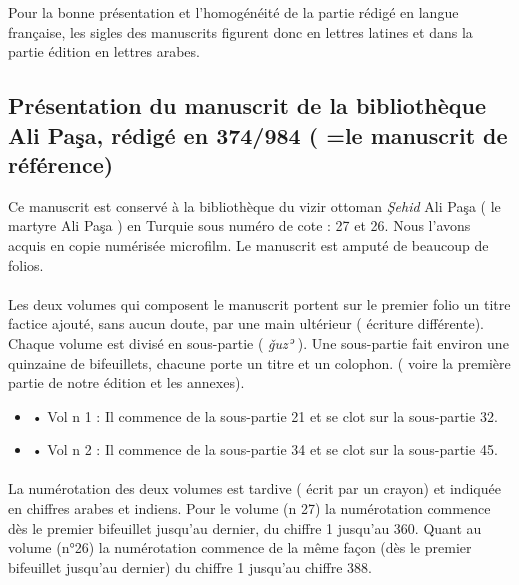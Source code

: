 \documentclass[a4paper,12pt]{report}
\begin{document}
\begin{itemize}
\begin{enumerate}
Pour la bonne présentation et l'homogénéité de la partie rédigé en langue française, les sigles des manuscrits figurent donc en  lettres latines et dans la partie édition en lettres arabes. 
 

\subsection{	Présentation du manuscrit de la bibliothèque  Ali Paşa, rédigé en 374/984  ( =le manuscrit de référence) } 

Ce manuscrit est conservé à la bibliothèque du vizir ottoman \textit{Şehid }Ali Paşa ( le martyre  Ali Paşa ) en Turquie sous numéro de cote : 27 et 26. Nous l'avons acquis en  copie numérisée  microfilm. Le manuscrit est amputé de beaucoup de folios.  
\paragraph{}

Les deux volumes qui composent le manuscrit portent sur le premier folio un titre factice  ajouté, sans aucun doute,  par une main ultérieur ( écriture différente). Chaque volume est divisé en sous-partie ( \textit{ǧuzʾ} ). Une sous-partie fait environ une quinzaine de bifeuillets, chacune porte un titre et un colophon. ( voire la première partie de notre édition et les annexes).    

\begin{itemize}
    \item •	Vol  n 1 :  Il commence de la sous-partie 21 et se clot sur la sous-partie 32.

    \item •	Vol  n 2 :  Il commence de la sous-partie 34 et se clot sur la sous-partie 45. 
\end{itemize}
\paragraph{}
La numérotation   des deux volumes est tardive ( écrit par un crayon) et indiquée en chiffres arabes et indiens. Pour le volume (n 27) la numérotation commence dès le premier bifeuillet jusqu’au dernier, du chiffre 1 jusqu’au 360.  Quant au volume (n°26) la numérotation commence de la même façon  (dès  le premier bifeuillet jusqu’au dernier) du chiffre 1 jusqu’au chiffre 388.  


\end{enumerate}
\end{itemize}
\end{document}
